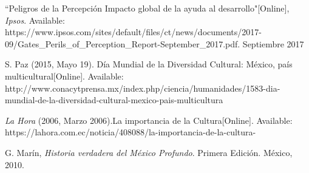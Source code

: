\begin{thebibliography}{X}
	\textnormal{ ``Peligros de la Percepción Impacto global de la ayuda al desarrollo"[Online], \textit{Ipsos}. Available: https://www.ipsos.com/sites/default/files/ct/news/documents/2017-09/Gates\_Perils\_of\_Perception\_Report-September\_2017.pdf. Septiembre 2017 }	

	\textnormal{ S. Paz (2015, Mayo 19). Día Mundial de la Diversidad Cultural: México, país multicultural[Online]. Available: http://www.conacytprensa.mx/index.php/ciencia/humanidades/1583-dia-mundial-de-la-diversidad-cultural-mexico-pais-multicultura
	}

	\textnormal{ \textit{La Hora} (2006, Marzo 2006).La importancia de la Cultura[Online]. Available: https://lahora.com.ec/noticia/408088/la-importancia-de-la-cultura-
	}

	\textnormal{ G. Marín, \textit{Historia verdadera del México Profundo}. Primera Edición. México, 2010.
	}
\end{thebibliography}